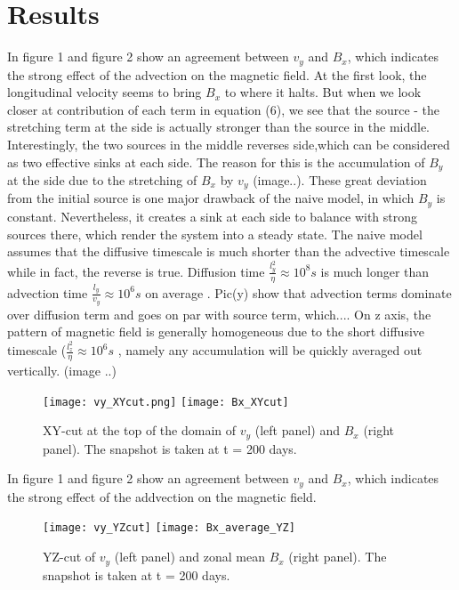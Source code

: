 \documentclass[11pt]{article}
\begin{document}
\section{Results}


In figure 1 and figure 2 show an agreement between $v_y$ and $B_x$, which indicates the strong effect of the advection on the magnetic field. At the first look, the longitudinal velocity seems to bring $B_x$ to where it halts. But when we look closer at contribution of each term in equation (6), we see that the source - the stretching term at the side is actually stronger than the source in the middle. Interestingly, the two sources in the middle reverses side,which can be considered as two effective sinks at each side. The reason for this is the accumulation of $B_y$ at the side due to the stretching of $B_x$ by $v_y$ (image..). These great deviation from the initial source is one major drawback of the naive model, in which $B_y$ is constant. Nevertheless, it creates a sink at each side to balance with strong sources there, which render the system into a steady state. 	
The naive model assumes that the diffusive timescale is much shorter than the advective timescale while in fact, the reverse is true. Diffusion time $\frac{l_y^2}{\eta} \approx 10^8 s $  is much longer than advection time $ \frac{l_y}{v_y} \approx 10^6 s$ on average . Pic(y) show that advection terms dominate over diffusion term and goes on par with source term, which.... On z axis, the pattern of magnetic field is generally homogeneous due to the short diffusive timescale ($\frac{l_z^2}{\eta} \approx 10^6 s $ , namely any accumulation will be quickly averaged out vertically. (image ..)


\begin{figure}
\texttt{[image: vy\_XYcut.png]}
\texttt{[image: Bx\_XYcut]}
\caption{ XY-cut at the top of the domain of $v_y$ (left panel) and  $B_x$ (right panel). The snapshot is taken at t = 200 days. }
\end{figure}

In figure 1 and figure 2 show an agreement between $v_y$ and $B_x$, which indicates the strong effect of the addvection on the magnetic field. 

\begin{figure}
\texttt{[image: vy\_YZcut]}
\texttt{[image: Bx\_average\_YZ]}
\caption{ YZ-cut of $v_y$ (left panel) and zonal mean $B_x$ (right panel). The snapshot is taken at t = 200 days. }
\end{figure}
\end{document}
